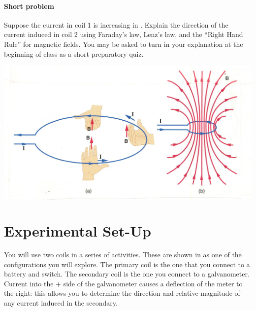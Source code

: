 \begin{multicols}{2}
\paragraph{Short problem}
Suppose the current in coil 1 is increasing in .  Explain the direction of the current induced in coil 2 using Faraday's law, Lenz's law, and the ``Right Hand Rule'' for magnetic fields.  You may be asked to turn in your explanation at the beginning of class as a short preparatory quiz.

\begin{center}
	\includegraphics[scale=0.6]{5bgraf/fig_11}
	\label{f:fig11}
\end{center}


\section{Experimental Set-Up}
You will use two coils in a series of activities.  These are shown in  as one of the configurations you will explore.  The primary coil is the one that you connect to a battery and switch.  The secondary coil is the one you connect to a galvanometer.  Current into the + side of the galvanometer causes a deflection of the meter to the right: this allows you to determine the direction and relative magnitude of any current induced in the secondary.




\end{multicols}
